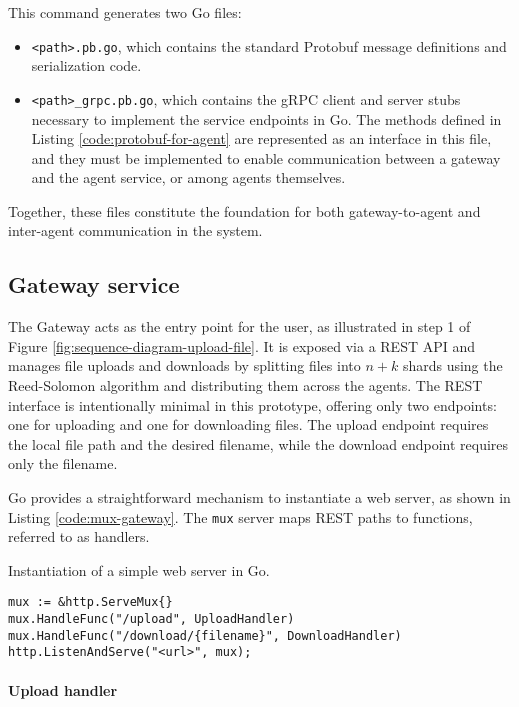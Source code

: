 This command generates two Go files: 
\begin{itemize}
    \item \texttt{<path>.pb.go}, which contains the standard Protobuf message definitions and serialization code.
    \item \texttt{<path>\_grpc.pb.go}, which contains the gRPC client and server stubs necessary to implement the service endpoints in Go. The methods defined in Listing \ref{code:protobuf-for-agent} are represented as an interface in this file, and they must be implemented to enable communication between a gateway and the agent service, or among agents themselves.
\end{itemize}

Together, these files constitute the foundation for both gateway-to-agent and inter-agent communication in the system.

\subsection{Gateway service} 

The Gateway acts as the entry point for the user, as illustrated in step 1 of Figure \ref{fig:sequence-diagram-upload-file}. It is exposed via a REST API and manages file uploads and downloads by splitting files into $n+k$ shards using the Reed-Solomon algorithm and distributing them across the agents. The REST interface is intentionally minimal in this prototype, offering only two endpoints: one for uploading and one for downloading files. The upload endpoint requires the local file path and the desired filename, while the download endpoint requires only the filename.

Go provides a straightforward mechanism to instantiate a web server, as shown in Listing \ref{code:mux-gateway}. The \texttt{mux} server maps REST paths to functions, referred to as handlers. 

\begin{listing}\caption{Instantiation of a simple web server in Go.}

\label{code:mux-gateway}
\begin{verbatim}
mux := &http.ServeMux{}
mux.HandleFunc("/upload", UploadHandler)
mux.HandleFunc("/download/{filename}", DownloadHandler)
http.ListenAndServe("<url>", mux);
\end{verbatim}
\end{listing}


\paragraph{Upload handler}

